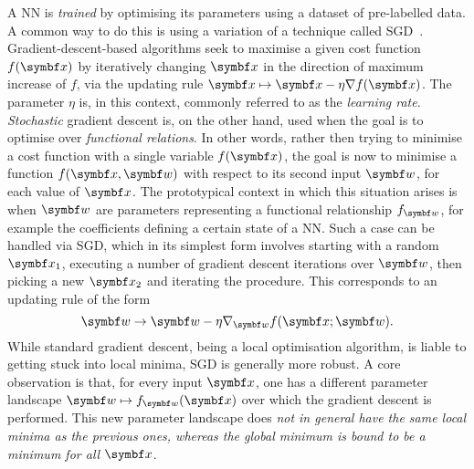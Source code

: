 A \ac{NN} is \emph{trained} by optimising its parameters using a dataset of pre-labelled data.
A common way to do this is using a variation of a technique called \acf{SGD}~\cite{wengert1964a,ruder2016overview}.
Gradient-descent-based algorithms seek to maximise a given cost function $f(\bs x)$ by iteratively changing $\bs x$ in the direction of maximum increase of $f$, via the updating rule $\bs x\mapsto\bs x-\eta\grad f(\bs x)$.
The parameter $\eta$ is, in this context, commonly referred to as the \emph{learning rate}.
\emph{Stochastic} gradient descent is, on the other hand, used when the goal is to optimise over \emph{functional relations}. In other words, rather then trying to minimise a cost function with a single variable $f(\bsx)$, the goal is now to minimise a function $f(\bsx,\bs w)$ with respect to its second input $\bs w$, for each value of $\bs x$.
The prototypical context in which this situation arises is when $\bs w$ are parameters representing a functional relationship $f_{\bs w}$, for example the coefficients defining a certain state of a \ac{NN}.
Such a case can be handled via \ac{SGD}, which in its simplest form involves starting with a random $\bs x_1$, executing a number of gradient descent iterations over $\bs w$, then picking a new $\bs x_2$ and iterating the procedure.
This corresponds to an updating rule of the form
\begin{equation}
	\bs w \to \bs w - \eta\grad_{\bs w}f(\bs x;\bs w).
	\label{eq:GL:updating_rule}
\end{equation}
While standard gradient descent, being a local optimisation algorithm, is liable to getting stuck into local minima, \ac{SGD} is generally more robust.
A core observation is that, for every input $\bsx$, one has a different parameter landscape $\bsw\mapsto f_\bsw(\bsx)$ over which the gradient descent is performed.
This new parameter landscape does \emph{not in general have the same local minima as the previous ones, whereas the global minimum is bound to be a minimum for all $\bsx$}.
